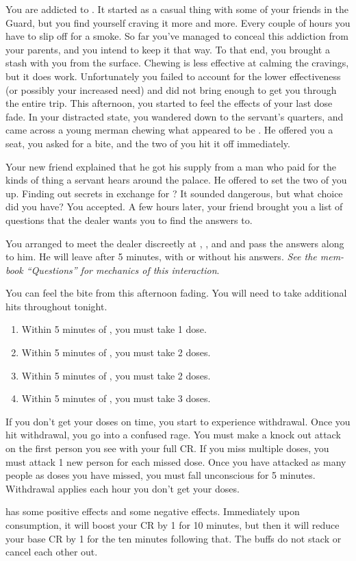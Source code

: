 \documentclass[green]{NeptuneBall}
\begin{document}
\name{\gAddicted{}}

You are addicted to \iDrug{}. It started as a casual thing with some of your friends in the Guard, but you find yourself craving it more and more. Every couple of hours you have to slip off for a smoke. So far you've managed to conceal this addiction from your parents, and you intend to keep it that way. To that end, you brought a stash with you from the surface. Chewing \iDrug{} is less effective at calming the cravings, but it does work. Unfortunately you failed to account for the lower effectiveness (or possibly your increased need) and did not bring enough to get you through the entire trip. This afternoon, you started to feel the effects of your last dose fade. In your distracted state, you wandered down to the servant's quarters, and came across a young merman chewing what appeared to be \iDrug{}. He offered you a seat, you asked for a bite, and the two of you hit it off immediately.

Your new friend explained that he got his supply from a man who paid for the kinds of thing a servant hears around the palace. He offered to set the two of you up. Finding out secrets in exchange for \iDrug{}? It sounded dangerous, but what choice did you have? You accepted. A few hours later, your friend brought you a list of questions that the dealer wants you to find the answers to.

You arranged to meet the dealer discreetly at \cTFifteen{\MYname{}}, \cTOneFifteen{\MYname{}}, \cTTwoFifteen{\MYname{}} and \cTThreeFifteen{\MYname{}} and pass the answers along to him. He will leave after 5 minutes, with or without his answers. \emph{See the mem-book ``Questions'' for mechanics of this interaction}.

You can feel the bite from this afternoon fading. You will need to take additional hits throughout tonight.
\begin{enumerate}
	\item Within 5 minutes of \cTFifteen{\MYname{}}, you must take 1 dose.
	\item Within 5 minutes of \cTOneFifteen{\MYname{}}, you must take 2 doses.
	\item Within 5 minutes of \cTTwoFifteen{\MYname{}}, you must take 2 doses.
	\item Within 5 minutes of \cTThreeFifteen{\MYname{}}, you must take 3 doses.
\end{enumerate}

If you don't get your doses on time, you start to experience withdrawal. Once you hit withdrawal, you go into a confused rage. You must make a knock out attack on the first person you see with your full CR. If you miss multiple doses, you must attack 1 new person for each missed dose. Once you have attacked as many people as doses you have missed, you must fall unconscious for 5 minutes. Withdrawal applies each hour you don't get your doses.

\iDrug{} has some positive effects and some negative effects. Immediately upon consumption, it will boost your CR by 1 for 10 minutes, but then it will reduce your base CR by 1 for the ten minutes following that. The buffs do not stack or cancel each other out.
\end{document}
